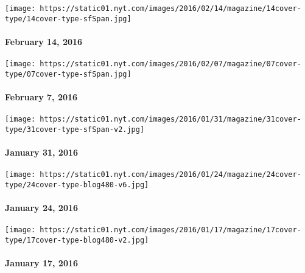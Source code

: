 \href{http://www.nytimes.com/indexes/2016/02/14/magazine/index.html}{}

\texttt{[image: https://static01.nyt.com/images/2016/02/14/magazine/14cover-type/14cover-type-sfSpan.jpg]}

\hypertarget{february-14-2016}{%
\paragraph{February 14, 2016}\label{february-14-2016}}

\href{http://www.nytimes.com/indexes/2016/02/09/magazine/index.html}{}

\texttt{[image: https://static01.nyt.com/images/2016/02/07/magazine/07cover-type/07cover-type-sfSpan.jpg]}

\hypertarget{february-7-2016}{%
\paragraph{February 7, 2016}\label{february-7-2016}}

\href{http://www.nytimes.com/indexes/2016/01/31/magazine/index.html}{}

\texttt{[image: https://static01.nyt.com/images/2016/01/31/magazine/31cover-type/31cover-type-sfSpan-v2.jpg]}

\hypertarget{january-31-2016}{%
\paragraph{January 31, 2016}\label{january-31-2016}}

\href{http://www.nytimes.com/indexes/2016/01/24/magazine/index.html}{}

\texttt{[image: https://static01.nyt.com/images/2016/01/24/magazine/24cover-type/24cover-type-blog480-v6.jpg]}

\hypertarget{january-24-2016}{%
\paragraph{January 24, 2016}\label{january-24-2016}}

\href{http://www.nytimes.com/indexes/2016/01/17/magazine/index.html}{}

\texttt{[image: https://static01.nyt.com/images/2016/01/17/magazine/17cover-type/17cover-type-blog480-v2.jpg]}

\hypertarget{january-17-2016}{%
\paragraph{January 17, 2016}\label{january-17-2016}}

